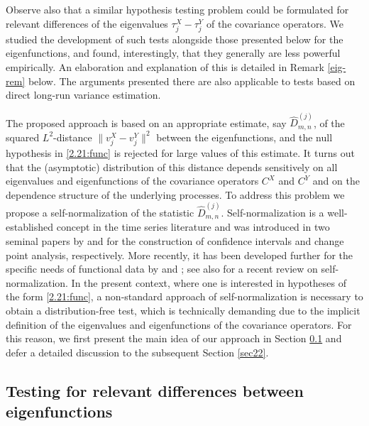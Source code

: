 \documentclass[11pt]{article}
\numberwithin{equation}{section}
\numberwithin{theorem}{section}
\numberwithin{lemma}{section}
\numberwithin{proposition}{section}
\numberwithin{cor}{section}
\numberwithin{definition}{section}
\numberwithin{cons}{section}
\numberwithin{rem}{section}
\numberwithin{exa}{section}
\numberwithin{table}{section}
\numberwithin{figure}{section}
\numberwithin{algo}{section}
\begin{document}
{{Observe also that a similar hypothesis testing problem could be formulated for relevant differences of the eigenvalues $\tau^X_j- \tau^Y_j$ of the covariance operators. We studied the development of such tests alongside those presented below for the eigenfunctions, and found, interestingly, that they generally are less powerful empirically. An elaboration and explanation of this is detailed in Remark \ref{eig-rem} below. The arguments presented there are also applicable to tests based on direct long-run variance estimation.

The proposed approach is based on an  appropriate estimate, say $ \hat D^{(j)}_{m,n}$,  of the squared $L^{2}$-distance $\| v^X_j - v^Y_j  \|^2$ between the eigenfunctions,  and
the null hypothesis  in \eqref{2.21:func} is rejected for large values of this estimate. It turns out that the
(asymptotic) distribution of this distance depends sensitively on all eigenvalues and eigenfunctions of the covariance operators $C^{X}$ and $C^{Y}$ and on
the dependence structure of the
underlying processes. To address this problem  we propose a self-normalization of  the statistic $ \hat D^{(j)}_{m,n}$.
Self-normalization is a well-established concept in the time series literature and was introduced in two seminal
papers   by  \cite{shao2010} and \cite{shazha2010} for the construction of confidence intervals  and change point analysis,
respectively. More recently, it has been developed further  for the specific needs of functional data by \cite{zhang2011}  and   \cite{zhangshao2015}; see also  \cite{shao2015} for a recent review on self-normalization.   In the present context,
 where one is interested in hypotheses of the form \eqref{2.21:func},  a non-standard approach  of self-normalization is necessary to obtain a  distribution-free test, which is technically demanding due to the implicit definition of the eigenvalues and  eigenfunctions
 of the  covariance operators.
 For this reason, we first present the main idea of our approach in Section \ref{sec21} and defer a detailed discussion to the subsequent Section \ref{sec22}.


 \subsection{Testing for relevant differences between eigenfunctions}
\label{sec21}



}}
\end{document}
